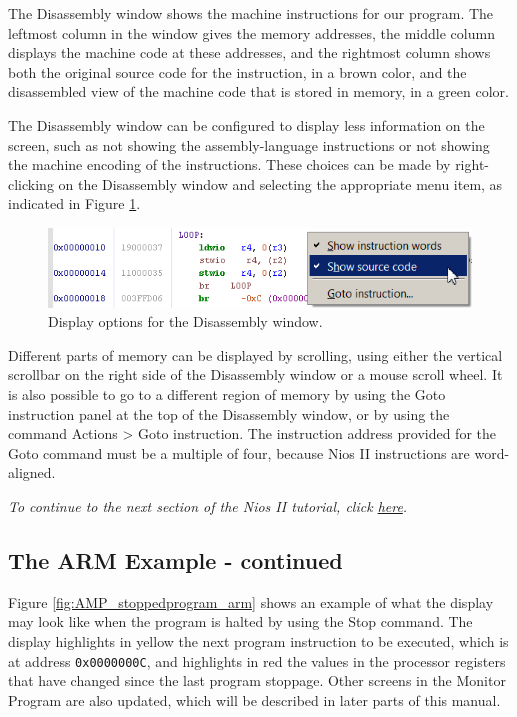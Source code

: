 \documentclass[11pt, twoside, pdftex]{article}
\begin{document}
The Disassembly window shows the machine instructions for 
our program.
The leftmost column in the window gives the memory addresses,
the middle column displays the machine code at these addresses,
and the rightmost column shows both the original source code for
the instruction, in a brown color, and the disassembled view of
the machine code that is stored in memory, in a green color.

The Disassembly window can be configured to display less information on the screen, such as 
not showing the assembly-language instructions or not showing the machine encoding of the instructions. These choices can 
be made by right-clicking on the Disassembly window and selecting
the appropriate menu item, as indicated in Figure \ref{fig:AMP_disassemblyoptions_nios}.

\begin{figure}[H]
   \begin{center}
      \includegraphics[scale=1]{screenshots/figure21.png}
   \end{center}
   \caption{Display options for the Disassembly window.} 
   \label{fig:AMP_disassemblyoptions_nios}
\end{figure}

Different parts of memory can be displayed by scrolling, 
using either the vertical scrollbar on the right side of the Disassembly window or a mouse scroll wheel.
It is also possible to go to a different region of memory by 
using the \textsf{Goto instruction} panel 
at the top of the Disassembly window, or by using the command \textsf{Actions > Goto instruction}.  The instruction address
provided for the {\sf Goto} command must be a multiple of four,
because Nios II instructions are word-aligned.

{\it To continue to the next section of the Nios II tutorial, click \hyperref[tut:nios_4]{here}.}

\subsection{The ARM Example - continued}
\label{tut:arm_2}

Figure \ref{fig:AMP_stoppedprogram_arm} shows an example of what the display may look like when
the program is halted by using the {\sf Stop} command. 
The display highlights in yellow the next program instruction to
be executed, which is at address \texttt {0x0000000C},
and highlights in red the values in the processor
registers that have changed since the last program stoppage.
Other screens in the Monitor Program are also updated, which will
be described in later parts of this manual.
\end{document}
